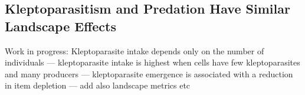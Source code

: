 \documentclass[11pt]{article}
\begin{document}
\subsection{Kleptoparasitism and Predation Have Similar Landscape Effects}

Work in progress: Kleptoparasite intake depends only on the number of individuals --- kleptoparasite intake is highest when cells have few kleptoparasites and many producers --- kleptoparasite emergence is associated with a reduction in item depletion --- add also landscape metrics etc





\end{document}
